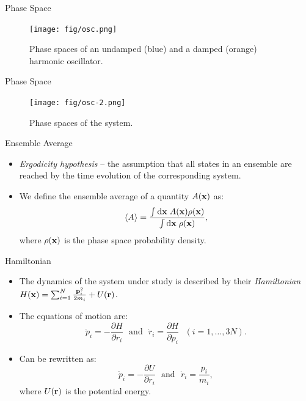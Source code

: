 \documentclass[10pt]{beamer}
\begin{document}
\begin{frame}{Phase Space}
\begin{figure}
  \texttt{[image: fig/osc.png]}
  \caption{Phase spaces of an undamped (blue) and a damped (orange) harmonic oscillator.}
\end{figure}
\end{frame}

\begin{frame}{Phase Space}
\begin{figure}
  \texttt{[image: fig/osc-2.png]}
  \caption{Phase spaces of the system.}
\end{figure}
\end{frame}

\begin{frame}{Ensemble Average}
\begin{itemize}
\setlength\itemsep{1em}
  \item \textit{Ergodicity hypothesis} -- the assumption that all states in an ensemble are reached by the time evolution of the corresponding system.
  \item We define the ensemble average of a quantity $A({\bf x})$ as:
  \begin{equation}
    \left< A \right> = \frac{\int \mathrm{d}{\bf x}\; A({\bf x}) \rho({\bf x})}{\int \mathrm{d}{\bf x}\; \rho({\bf x})},
  \end{equation}
  where $\rho({\bf x})$ is the phase space probability density.
\end{itemize}
\end{frame}

\begin{frame}{Hamiltonian}
\begin{itemize}
\setlength\itemsep{1em}
  \item The dynamics of the system under study is described by their \textit{Hamiltonian} $H({\bf x})=\sum_{i=1}^N \frac{{\bf p}_i^2}{2m_i} + U({\bf r})$.
  \item The equations of motion are:
  \begin{equation}
    \dot{p}_i = -\frac{\partial{H}}{\partial{r_i}}
    ~~~\mathrm{and}~~~
    \dot{r}_i = \frac{\partial{H}}{\partial{p_i}}~~~(i=1,\dots,3N).
  \end{equation}
  \item Can be rewritten as:
  \begin{equation}
    \dot{p}_i = -\frac{\partial{U}}{\partial{r_i}}
    ~~~\mathrm{and}~~~
    \dot{r}_i = \frac{p_i}{m_i},
  \end{equation}
  where $U({\bf r})$ is the potential energy.
\end{itemize}
\end{frame}
\end{document}
